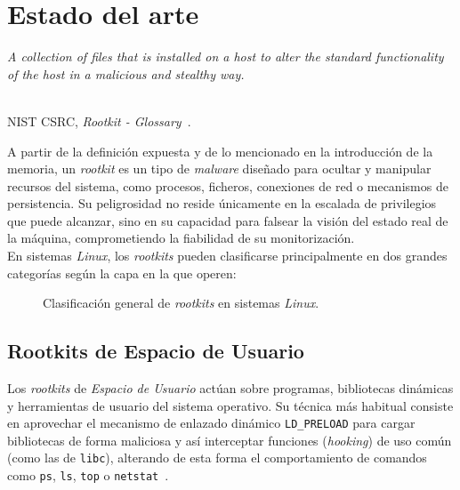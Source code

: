 \chapter{Estado del arte}
\label{cap:capitulo3}

\begin{flushright}
\begin{minipage}[]{10cm}
\emph{\guillemotleft A collection of files that is installed on a host to alter the standard functionality of the host in a malicious and stealthy way.\guillemotright}\\
\end{minipage}\\

NIST CSRC, \textit{Rootkit - Glossary}~\cite{nist_rootkit}.\\
\end{flushright}

A partir de la definición expuesta y de lo mencionado en la introducción de la memoria, un \textit{rootkit} es un tipo de \textit{malware} diseñado para ocultar y manipular recursos del sistema, como procesos, ficheros, conexiones de red o mecanismos de persistencia.
Su peligrosidad no reside únicamente en la escalada de privilegios que puede alcanzar, sino en su capacidad para falsear la visión del estado real de la máquina, comprometiendo la fiabilidad de su monitorización.\\

En sistemas \textit{Linux}, los \textit{rootkits} pueden clasificarse principalmente en dos grandes categorías según la capa en la que operen:\\

\begin{figure}[h!]
  \centering
  \scalebox{0.9}{}
  \caption{Clasificación general de \textit{rootkits} en sistemas \textit{Linux}.}
  \label{fig:rootkits_types}
\end{figure}

\section{Rootkits de Espacio de Usuario}
\label{sec:user_rootkits}

Los \textit{rootkits} de \textit{Espacio de Usuario} actúan sobre programas, bibliotecas dinámicas y herramientas de usuario del sistema operativo.
Su técnica más habitual consiste en aprovechar el mecanismo de enlazado dinámico \texttt{LD\_PRELOAD} para cargar bibliotecas de forma maliciosa y así interceptar funciones (\textit{hooking}) de uso común (como las de \texttt{libc}),
alterando de esta forma el comportamiento de comandos como \texttt{ps}, \texttt{ls}, \texttt{top} o \texttt{netstat}~\cite{rootkits}.\\

